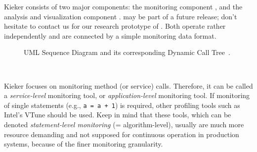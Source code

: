 \documentclass[a4paper,12pt]{scrartcl}
\begin{document}
Kieker consists of two major components: the monitoring component \textbf{\tpmon{}}, and the analysis and visualization component \textbf{\tpan{}}. \tpan{} may be part of a future release; don't hesitate to contact us for our research prototype of \tpan{}. Both operate rather independently and are connected by a simple monitoring data format. %

\begin{figure}
\centering
{}
\hspace{1cm}
\caption{UML Sequence Diagram and its corresponding Dynamic Call Tree~\citep{RohrVanHoornGieseckeMatevskaHasselbring08TraceContextSensitivePerformanceModelsFromMonitoringDataOfSoftwareSystems}.
}\label{visualizationExample1}
\end{figure}

\

Kieker focuses on monitoring method (or service) calls. Therefore, it can be called a \textit{service-level} monitoring tool, or \textit{application-level} monitoring tool. If monitoring of single statements (e.g., {\small \texttt{a = a + 1}}) is required, other profiling tools such as Intel's VTune should be used. Keep in mind that these tools, which can be denoted \textit{statement-level monitoring} (= algorithm-level), usually are much more resource demanding and not supposed for continuous operation in production systems, because of the finer monitoring granularity.
\end{document}
